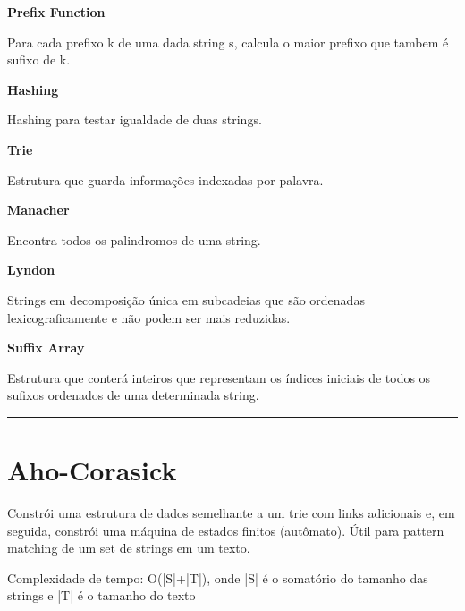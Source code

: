 \documentclass[11pt, a4paper, twoside]{book}
\begin{document}
\textbf{Prefix Function} 



Para cada prefixo k de uma dada string s, calcula o maior prefixo que tambem é sufixo de k.





\textbf{Hashing} 



Hashing para testar igualdade de duas strings.





\textbf{Trie} 



Estrutura que guarda informações indexadas por palavra.   





\textbf{Manacher} 



Encontra todos os palindromos de uma string.





\textbf{Lyndon} 



Strings em decomposição única em subcadeias que são ordenadas lexicograficamente e não podem ser mais reduzidas.





\textbf{Suffix Array} 



Estrutura que conterá inteiros que representam os índices iniciais de todos os sufixos ordenados de uma determinada string.






\hfill

\rule{\textwidth}{0.4pt}

\section{Aho-Corasick}



Constrói uma estrutura de dados semelhante a um trie com links adicionais e, em seguida, constrói uma máquina de estados finitos (autômato). Útil para pattern matching de um set de strings em um texto.



Complexidade de tempo: O(|S|+|T|), onde |S| é o somatório do tamanho das strings e |T| é o tamanho do texto
\end{document}
